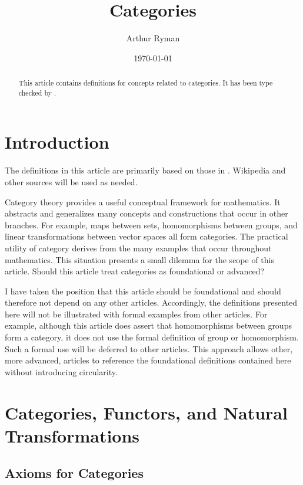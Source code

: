 \documentclass{amsart}
\begin{document}
\title{Categories}
\author{Arthur Ryman}
\date{\today}

\begin{abstract}
    This article contains \ZN\cite{spivey-zrm} definitions for
    concepts related to categories.
    It has been type checked by \fuzz\cite{spivey-fm}.
\end{abstract}

\maketitle

\tableofcontents

\section{Introduction}

The definitions in this article are primarily based on those in \cite{maclane-cftwm}.
Wikipedia and other sources will be used as needed.

Category theory provides a useful conceptual framework for mathematics.
It abstracts and generalizes many concepts and constructions that occur in other branches.
For example, maps between sets, homomorphisms between groups, and linear transformations between vector spaces
all form categories.
The practical utility of category derives from the many examples that occur throughout mathematics.
This situation presents a small dilemma for the scope of this article.
Should this article treat categories as foundational or advanced?

I have taken the position that this article should be foundational and 
should therefore not depend on any other articles.
Accordingly, the definitions presented here will not be illustrated with formal examples from
other articles.
For example, although this article does assert that homomorphisms between groups form a category, 
it does not use the formal definition of group or homomorphism.
Such a formal use will be deferred to other articles.
This approach allows other, more advanced, articles to reference the foundational definitions 
contained here without introducing circularity.

\section{Categories, Functors, and Natural Transformations}

\subsection{Axioms for Categories}
\end{document}
